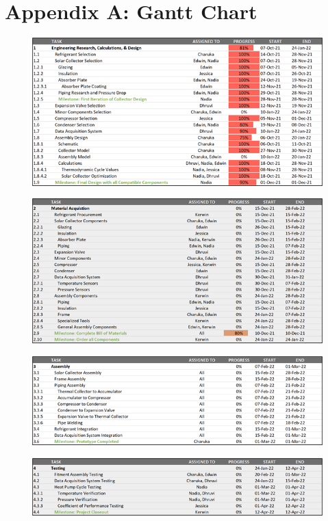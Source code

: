 \chapter{Appendix A: Gantt Chart}

\begin{figure}[H]
    \centering
    \includegraphics[width=15cm]{images/gantt1.png}
\end{figure}
\begin{figure}[H]
    \centering
    \includegraphics[width=15cm]{images/gantt2.png}
\end{figure}
\begin{figure}[H]
    \centering
    \includegraphics[width=15cm]{images/gantt3.png}
\end{figure}
\begin{figure}[H]
    \centering
    \includegraphics[width=15cm]{images/gantt4.png}
\end{figure}
